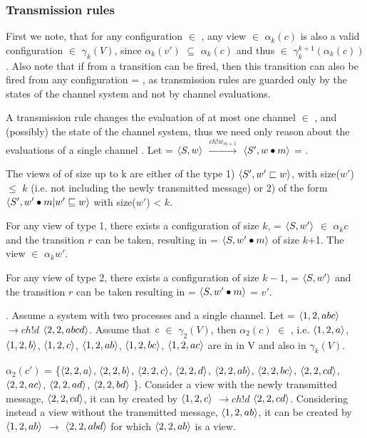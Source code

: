 \subsubsection{Transmission rules}
\label{proofTransmission}
First we note, that for any configuration  $\in$ , any view  $\in$ $\alpha_k(c)$ is also a valid configuration  $\in$ $\gamma_k(V)$, since $\alpha_k(v')$ $\subseteq$ $\alpha_k(c)$ and thus  $\in$ $\gamma_k^{k+1}(\alpha_k(c))$. Also note that if from  a transition  can be fired, then this transition can also be fired from any configuration  = , as transmission rules are guarded only by the states of the channel system and not by channel evaluations.

A transmission rule changes the evaluation of at most one channel  $\in$ , and (possibly) the state of the channel system, thus we need only reason about the evaluations of a single channel .
Let  = $\langle S, w\rangle$ $\xrightarrow{ch!w_{m+1}}$ $\langle S', w \bullet m\rangle$ = .

The views of  of size up to k are either of the type 1) $\langle S', w' \sqsubset w\rangle$, with size($w'$) $\leq$ $k$ (i.e. not including the newly transmitted message) or 2) of the form $\langle S', w' \bullet m | w' \sqsubseteq w\rangle$ with size($w'$) < $k$.

For any view of type 1, there exists a configuration of size $k$,  = $\langle S, w'\rangle$ $\in$ $\alpha_k{c}$ and the transition $r$ can be taken, resulting in  = $\langle S, w'\bullet m\rangle$ of size $k$+1. The view  $\in$ $\alpha_k{w'}$.

For any view of type 2, there exists a configuration of size $k-1$,  = $\langle S, w'\rangle$ and the transition $r$ can be taken resulting in  = $\langle S, w'\bullet m\rangle$ = $v'$.

. Assume a system with two processes and a single channel. Let  = $\langle1,2,abc\rangle$ $\rightarrow{ch!d}$ $\langle2,2,abcd\rangle$. Assume that $\emph{c}$ $\in$ $\gamma_2(V)$, then $\alpha_2(c)$ $\in$ , i.e. 
$\langle1,2,a\rangle$, $\langle1,2,b\rangle$, $\langle1,2,c\rangle$, $\langle1,2,ab\rangle$, $\langle1,2,bc\rangle$, $\langle1,2,ac\rangle$ are in in V and also in $\gamma_k(V)$.

$\alpha_2(c')$ = \{$\langle2,2,a\rangle$, $\langle2,2,b\rangle$, $\langle2,2,c\rangle$, $\langle2,2,d\rangle$, $\langle2,2,ab\rangle$, $\langle2,2,bc\rangle$, $\langle2,2,cd\rangle$, $\langle2,2,ac\rangle$, $\langle2,2,ad\rangle$, $\langle2,2,bd\rangle $ \}. Consider a view with the newly transmitted message, $\langle2,2,cd\rangle$, it can by created by $\langle1,2,c\rangle$ $\rightarrow{ch!d}$ $\langle2,2,cd\rangle$. Considering instead a view without the transmitted message, $\langle1,2,ab\rangle$, it can be created by $\langle1,2,ab\rangle$ $\rightarrow$ $\langle2,2,abd\rangle$ for which $\langle2,2,ab\rangle$ is a view.

